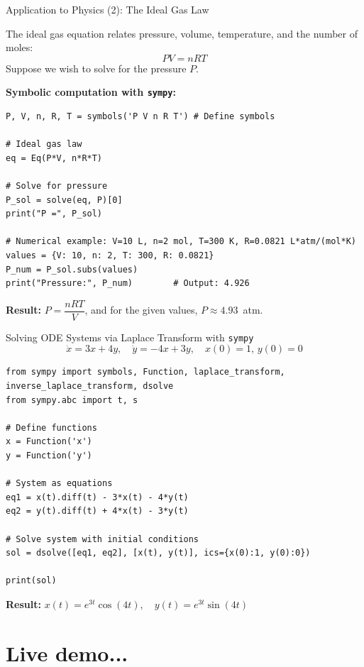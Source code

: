 \documentclass[10pt]{beamer}
\begin{document}
\begin{frame}[fragile]{Application to Physics (2): The Ideal Gas Law}

The ideal gas equation relates pressure, volume, temperature, and the number of moles:
\[
PV = nRT
\]
Suppose we wish to solve for the pressure $P$.

\vspace{0mm}
\textbf{Symbolic computation with \texttt{sympy}:}

\begin{lstlisting}[style=mypython]
P, V, n, R, T = symbols('P V n R T') # Define symbols

# Ideal gas law
eq = Eq(P*V, n*R*T)

# Solve for pressure
P_sol = solve(eq, P)[0]
print("P =", P_sol)

# Numerical example: V=10 L, n=2 mol, T=300 K, R=0.0821 L*atm/(mol*K)
values = {V: 10, n: 2, T: 300, R: 0.0821}
P_num = P_sol.subs(values)
print("Pressure:", P_num)        # Output: 4.926
\end{lstlisting}

\vspace{2mm}
\textbf{Result:} $P = \dfrac{nRT}{V}$, and for the given values, $P \approx 4.93$~atm.
\end{frame}

\begin{frame}[fragile]{Solving ODE Systems via Laplace Transform with \texttt{sympy}}
\vspace{-0.3cm}
\[
\dot{x} = 3x + 4y,\quad \dot{y} = -4x + 3y,\quad x(0) = 1,\, y(0) = 0
\]
\begin{lstlisting}[style=mypython]
from sympy import symbols, Function, laplace_transform, inverse_laplace_transform, dsolve
from sympy.abc import t, s

# Define functions
x = Function('x')
y = Function('y')

# System as equations
eq1 = x(t).diff(t) - 3*x(t) - 4*y(t)
eq2 = y(t).diff(t) + 4*x(t) - 3*y(t)

# Solve system with initial conditions
sol = dsolve([eq1, eq2], [x(t), y(t)], ics={x(0):1, y(0):0})

print(sol)
\end{lstlisting}

\textbf{Result:} $x(t) = e^{3t}\cos(4t),\quad y(t) = e^{3t}\sin(4t)$  
\end{frame}

\section{\textbf{Live demo...}}
\end{document}
